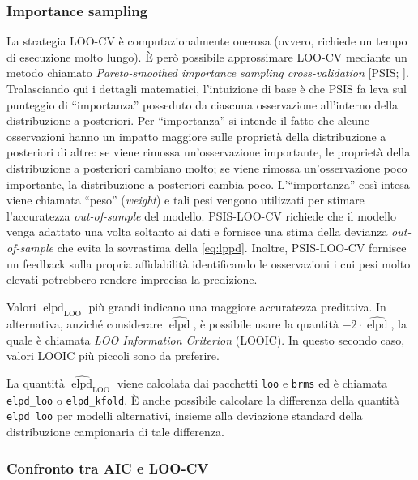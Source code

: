 \documentclass[
  10pt,
  italian,
  a4paper,
  extrafontsizes,onecolumn,openright
  ]{memoir}
\DeclareMathOperator{\elpd}{elpd} %
\DeclareMathOperator{\LOO}{LOO} %
\theoremstyle{definition}
\theoremstyle{definition}
\theoremstyle{definition}
\theoremstyle{definition}
\theoremstyle{remark}
\begin{document}
\hypertarget{importance-sampling}{%
\subsubsection{Importance sampling}\label{importance-sampling}}

La strategia LOO-CV è computazionalmente onerosa (ovvero, richiede un tempo di esecuzione molto lungo). È però possibile approssimare LOO-CV mediante un metodo chiamato \emph{Pareto-smoothed importance sampling cross-validation} {[}PSIS; \textcite{vehtari2017practical}{]}. Tralasciando qui i dettagli matematici, l'intuizione di base è che PSIS fa leva sul punteggio di ``importanza'' posseduto da ciascuna osservazione all'interno della distribuzione a posteriori. Per ``importanza'' si intende il fatto che alcune osservazioni hanno un impatto maggiore sulle proprietà della distribuzione a posteriori di altre: se viene rimossa un'osservazione importante, le proprietà della distribuzione a posteriori cambiano molto; se viene rimossa un'osservazione poco importante, la distribuzione a posteriori cambia poco.
L'``importanza'' così intesa viene chiamata ``peso'' (\emph{weight}) e tali pesi vengono utilizzati per stimare l'accuratezza \emph{out-of-sample} del modello.
PSIS-LOO-CV richiede che il modello venga adattato una volta soltanto ai dati e fornisce una stima della devianza \emph{out-of-sample} che evita la sovrastima della \eqref{eq:lppd}. Inoltre, PSIS-LOO-CV fornisce un feedback sulla propria affidabilità identificando le osservazioni i cui pesi molto elevati potrebbero rendere imprecisa la predizione.

Valori \(\widehat{\elpd}_{\LOO}\) più grandi indicano una maggiore accuratezza predittiva. In alternativa, anziché considerare \(\widehat{\elpd}\), è possibile usare la quantità \(-2 \cdot \widehat{\elpd}\),
la quale è chiamata \emph{LOO Information Criterion} (LOOIC). In questo secondo caso, valori LOOIC più piccoli sono da preferire.

La quantità \(\widehat{\elpd}_{\LOO}\) viene calcolata dai pacchetti \texttt{loo} e \texttt{brms} ed è chiamata \texttt{elpd\_loo} o \texttt{elpd\_kfold}. È anche possibile calcolare la differenza della quantità \texttt{elpd\_loo} per modelli alternativi, insieme alla deviazione standard della distribuzione campionaria di tale differenza.

\hypertarget{confronto-tra-aic-e-loo-cv}{%
\subsubsection{Confronto tra AIC e LOO-CV}\label{confronto-tra-aic-e-loo-cv}}
\end{document}

